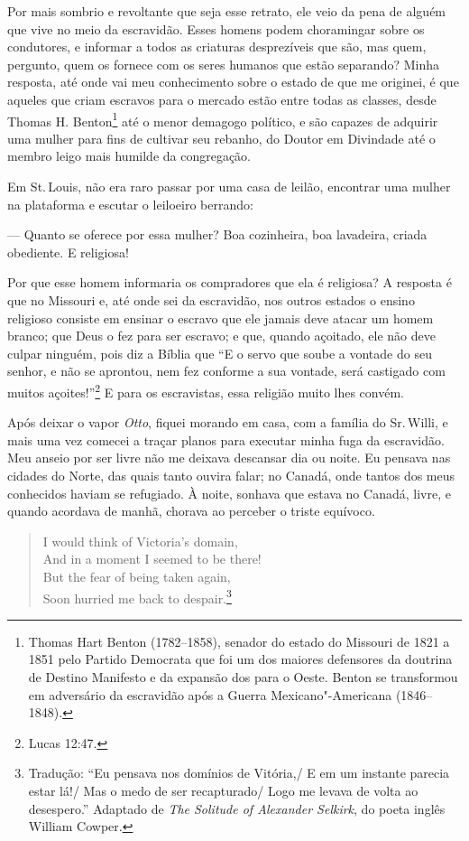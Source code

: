 Por mais sombrio e revoltante que seja esse retrato, ele veio da pena de
alguém que vive no meio da escravidão. Esses homens podem choramingar
sobre os condutores, e informar a todos as criaturas desprezíveis que
são, mas quem, pergunto, quem os fornece com os seres humanos que estão
separando? Minha resposta, até onde vai meu conhecimento sobre o estado
de que me originei, é que aqueles que criam escravos para o mercado
estão entre todas as classes, desde Thomas H. Benton\footnote{Thomas
  Hart Benton (1782--1858), senador do estado do Missouri de 1821 a 1851
  pelo Partido Democrata que foi um dos maiores defensores da doutrina
  de Destino Manifesto e da expansão dos  para o Oeste. Benton se
  transformou em adversário da escravidão após a Guerra
  Mexicano"-Americana (1846--1848).} até o menor demagogo político, e são
capazes de adquirir uma mulher para fins de cultivar seu rebanho, do
Doutor em Divindade até o membro leigo mais humilde da congregação.

Em St.\,Louis, não era raro passar por uma casa de leilão, encontrar uma
mulher na plataforma e escutar o leiloeiro berrando:

--- Quanto se oferece por essa mulher? Boa cozinheira, boa lavadeira,
criada obediente. E religiosa!

Por que esse homem informaria os compradores que ela é religiosa? A
resposta é que no Missouri e, até onde sei da escravidão, nos outros
estados o ensino religioso consiste em ensinar o escravo que ele jamais
deve atacar um homem branco; que Deus o fez para ser escravo; e que,
quando açoitado, ele não deve culpar ninguém, pois diz a Bíblia que ``E
o servo que soube a vontade do seu senhor, e não se aprontou, nem fez
conforme a sua vontade, será castigado com muitos açoites!''\footnote{Lucas
  12:47.} E para os escravistas, essa religião muito lhes convém.

Após deixar o vapor \emph{Otto}, fiquei morando em casa, com a família
do Sr.\,Willi, e mais uma vez comecei a traçar planos para executar minha
fuga da escravidão. Meu anseio por ser livre não me deixava descansar
dia ou noite. Eu pensava nas cidades do Norte, das quais tanto ouvira
falar; no Canadá, onde tantos dos meus conhecidos haviam se refugiado. À
noite, sonhava que estava no Canadá, livre, e quando acordava de manhã,
chorava ao perceber o triste equívoco.

\begin{verse}
I would think of Victoria's domain,\\
And in a moment I seemed to be there!\\
But the fear of being taken again,\\
Soon hurried me back to despair.\footnote{Tradução: ``Eu pensava nos domínios de Vitória,/ E em um instante parecia estar lá!/ Mas o medo de ser recapturado/ Logo me levava de volta ao desespero.'' Adaptado de \emph{The Solitude of Alexander Selkirk}, do poeta inglês William Cowper.}
\end{verse}


